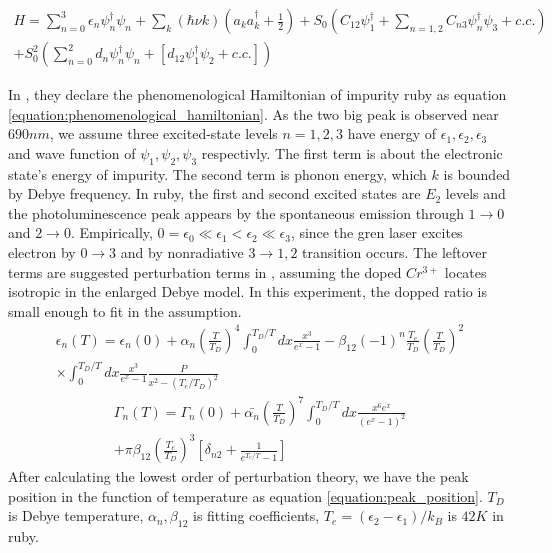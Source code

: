 \documentclass{article}
\begin{document}
 \begin{multline}
  H= \sum_{n=0}^3 \epsilon_n \psi_n^\dagger \psi_n + \sum_k (\hbar \nu k) (a_k a_k^\dagger + \frac{1}{2}) + S_0 (C_{12} \psi_1^\dagger + \sum_{n=1,2} C_{n3} \psi_n^\dagger \psi_3 + c.c.) \\
   + S_0^2 (\sum_{n=0}^2 d_n \psi_n^\dagger \psi_n + [d_{12}\psi_1^\dagger \psi_2 + c.c.])
  \label{equation:phenomenological_hamiltonian}
 \end{multline}

 In \cite{Ruby_temp_theoretical}, they declare the phenomenological Hamiltonian of impurity ruby as equation \ref{equation:phenomenological_hamiltonian}.
 As the two big peak is observed near $690nm$, we assume three excited-state levels $n=1,2,3$ have energy of $\epsilon_1, \epsilon_2, \epsilon_3$ and wave function of $\psi_1, \psi_2, \psi_3$ respectivly.
 The first term is about the electronic state's energy of impurity.
 The second term is phonon energy, which $k$ is bounded by Debye frequency.
 In ruby, the first and second excited states are $E_2$ levels and the photoluminescence peak appears by the spontaneous emission through $1\rightarrow0$ and $2\rightarrow0$.
 Empirically, $0=\epsilon_0 \ll \epsilon_1 < \epsilon_2 \ll \epsilon_3$, since the gren laser excites electron by $0\rightarrow3$ and by nonradiative $3\rightarrow1,2$ transition occurs.
 The leftover terms are suggested perturbation terms in \cite{Ruby_temp_theoretical}, assuming the doped $Cr^{3+}$ locates isotropic in the enlarged Debye model.
 In this experiment, the dopped ratio is small enough to fit in the assumption.
 \begin{multline}
  \epsilon_n (T) = \epsilon_n (0) + \alpha_n (\frac{T}{T_D})^4 \int_{0}^{T_D / T} dx \frac{x^3}{e^x -1} - \beta_{12} (-1)^n \frac{T_e}{T_D} (\frac{T}{T_D})^2 \\
  \times \int^{T_D/T}_{0} dx \frac{x^3}{e^x -1} \frac{P}{x^2 - (T_e/T_D)^2}
  \label{equation:peak_position}
 \end{multline}
 \begin{multline}
  \Gamma_n(T) = \Gamma_n(0) + \bar{\alpha_n} (\frac{T}{T_D})^7 \int^{T_D/T}_{0} dx \frac{x^6 e^x}{(e^x -1)^2}\\ + \pi \beta_{12} (\frac{T_e}{T_D})^3 [\delta_{n2}+\frac{1}{e^{T_e/T}-1}]
  \label{equation:peak_width}
 \end{multline}
 After calculating the lowest order of perturbation theory, we have the peak position in the function of temperature as equation \ref{equation:peak_position}.
 $T_D$ is Debye temperature, $\alpha_n , \beta_{12}$ is fitting coefficients, $T_e=(\epsilon_2 - \epsilon_1)/k_B$ is $42K$ in ruby.
\end{document}

